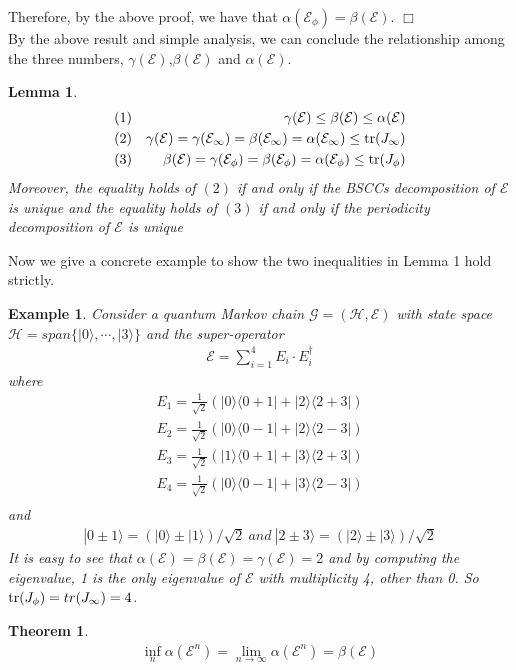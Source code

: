 \documentclass{article}
\newcommand{\tr}{{\rm tr}}
\def\E{\mathcal{E}}
\def\G{\mathcal{G}}
\def\H{\mathcal{H}}
\newtheorem{theorem}{Theorem}
\newtheorem{lemma}{Lemma}
\newtheorem{example}{Example}
\begin{document}
Therefore, by the above proof, we have that $\alpha(\E_{\phi})=\beta(\E)$.
\hfill $\Box$\\

By the above result and simple analysis, we can conclude the relationship among the three numbers, $\gamma(\E)$,$\beta(\E)$ and $\alpha(\E)$.
\begin{lemma}\label{Inequa}
\begin{eqnarray*}
&(1)&\gamma(\E)\leq\beta(\E)\leq\alpha(\E)\\
&(2)&\gamma(\E)=\gamma(\E_{\infty})=\beta(\E_{\infty})=\alpha(\E_{\infty})\leq\textnormal{tr}(J_{\infty})\\
&(3)&\beta(\E)=\gamma(\E_{\phi})=\beta(\E_{\phi})=\alpha(\E_{\phi})\leq \textnormal{tr}(J_{\phi})
\end{eqnarray*}
Moreover, the equality holds of $(2)$ if and only if the BSCCs decomposition of $\E$ is unique and  the equality holds of $(3)$ if and only if the periodicity decomposition of $\E$ is unique
\end{lemma}
Now we give a concrete example to show the two inequalities in Lemma 1 hold strictly.
\begin{example}
Consider a quantum Markov chain $\G=(\H,\E)$ with state space $\H=span\{|0\rangle,\cdots,|3\rangle\}$ and the super-operator
\begin{eqnarray*}
\E=\sum_{i=1}^{4}E_{i}\cdot E_{i}^\dagger
\end{eqnarray*}
where 
\begin{eqnarray*}
E_{1}=\frac{1}{\sqrt{2}}(|0\rangle\langle 0+1|+|2\rangle\langle 2+3|)\\
E_{2}=\frac{1}{\sqrt{2}}(|0\rangle\langle 0-1|+|2\rangle\langle 2-3|)\\
E_{3}=\frac{1}{\sqrt{2}}(|1\rangle\langle 0+1|+|3\rangle\langle 2+3|)\\
E_{4}=\frac{1}{\sqrt{2}}(|0\rangle\langle 0-1|+|3\rangle\langle 2-3|)\\
\end{eqnarray*}
and 
\begin{eqnarray*}
|0\pm 1\rangle=(|0\rangle \pm|1\rangle)/\sqrt{2} \ and  \ |2\pm 3\rangle=(|2\rangle \pm |3\rangle)/\sqrt{2}
\end{eqnarray*}
 It is easy to see that $\alpha(\E)=\beta(\E)=\gamma(\E)=2$ and by computing the eigenvalue, 1 is the only eigenvalue of $\E$ with multiplicity 4, other than 0. So $\tr(J_{\phi})=tr(J_{\infty})=4$.
\end{example}
\begin{theorem}
\begin{eqnarray*}
\inf_{n}\alpha(\E^{n})=\lim_{n\rightarrow \infty}\alpha(\E^n)=\beta(\E)
\end{eqnarray*}
\end{theorem}
\end{document}
